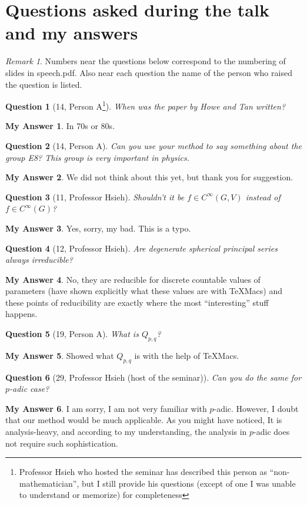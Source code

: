 \documentclass[12pt]{article} %
\theoremstyle{theorem}
\newtheorem{question}{Question}
\theoremstyle{definition}
\newtheorem{answer}{My Answer}
\theoremstyle{remark}
\newtheorem*{remark*}{Remark}
\begin{document}
\section{Questions asked during the talk and my answers}
\begin{remark*}
	Numbers near the questions below correspond to the numbering of slides in {\ttfamily speech.pdf}.
	Also near each question the name of the person who raised the question is listed.
\end{remark*}
\begin{question}[14, Person A\footnote{Professor Hsieh who hosted the seminar has described this person as ``non-mathematician'', but I still 
	provide his questions (except of one I was unable to understand or memorize) for completeness}]\label{question:howe}
	When was the paper by Howe and Tan written?
\end{question}
\begin{answer}
	In 70s or 80s.
\end{answer}
\begin{question}[14, Person A]
	Can you use your method to say something about the group E8?
	This group is very important in physics.
\end{question}
\begin{answer}
	We did not think about this yet, but thank you for suggestion.
\end{answer}
\begin{question}[11, Professor Hsieh]
	Shouldn't it be $f\in C^\infty(G,V)$ instead of $f\in C^\infty(G)$?
\end{question}
\begin{answer}
	Yes, sorry, my bad. This is a typo.
\end{answer}
\begin{question}[12, Professor Hsieh]
	Are degenerate spherical principal series always irreducible?
\end{question}
\begin{answer}
	No, they are reducible for discrete countable values of parameters (have shown explicitly what these values are with TeXMacs)
	and these points of reducibility are exactly where the most ``interesting'' stuff happens.
\end{answer}
\begin{question}[19, Person A]
	What is $Q_{p,q}$?
\end{question}
\begin{answer}
	Showed what $Q_{p,q}$ is with the help of TeXMacs.
\end{answer}
\begin{question}[29, Professor Hsieh (host of the seminar)]
	Can you do the same for $p$-adic case?
\end{question}
\begin{answer}
	I am sorry, I am not very familiar with $p$-adic. However, I doubt that
	our method would be much applicable. As you might have noticed, It is analysis-heavy,
	and according to my understanding, the analysis in $p$-adic does not require such sophistication.
\end{answer}
\end{document}
